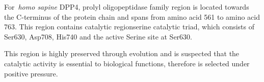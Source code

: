 For~\textit{homo sapine} DPP4, prolyl oligopeptidase family region is located towards the C-terminus of the protein chain and spans from amino acid 561 to amino acid 763. This region contains catalytic regionserine catalytic triad, which consists of Ser630, Asp708, His740 and the active Serine site at Ser630. \par
This region is highly preserved through evolution and is suspected that the catalytic activity is essential to biological functions, therefore is selected under positive pressure. 